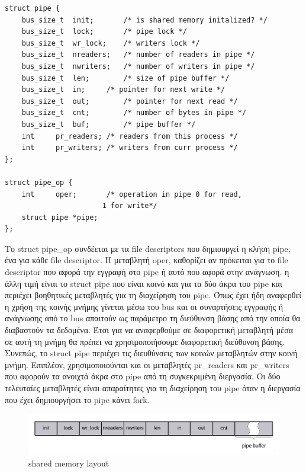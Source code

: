 \begin{lstlisting}
struct pipe {
	bus_size_t	init;		/* is shared memory initalized? */
	bus_size_t	lock;		/* pipe lock */
	bus_size_t	wr_lock;	/* writers lock */
	bus_size_t	nreaders;	/* number of readers in pipe */
	bus_size_t	nwriters;	/* number of writers in pipe */
	bus_size_t	len;		/* size of pipe buffer */
	bus_size_t	in;		/* pointer for next write */
	bus_size_t	out;		/* pointer for next read */
	bus_size_t	cnt;		/* number of bytes in pipe */
	bus_size_t	buf;		/* pipe buffer */
	int		pr_readers;	/* readers from this process */
	int		pr_writers;	/* writers from curr process */
};

struct pipe_op {
	int		oper;		/* operation in pipe 0 for read,
					   1 for write*/
	struct pipe	*pipe;
};
\end{lstlisting}

Το struct pipe\_op συνδέεται με τα file descriptors που δημιουργεί η κλήση pipe,
ένα για κάθε file descriptor. H μεταβλητή oper, καθορίζει αν πρόκειται για το
file descriptor που αφορά την εγγραφή στο pipe ή αυτό που αφορά στην ανάγνωση. η
άλλη τιμή είναι το struct pipe που είναι κοινό και για τα δύο άκρα του pipe και
περιέχει βοηθητικές μεταβλητές για τη διαχείρηση του pipe. Όπως έχει ήδη
αναφερθεί η χρήση της κοινής μνήμης γίνεται μέσω του bus και οι συναρτήσεις
εγγραφής ή ανάγνωσης από το bus απαιτούν ως παράμετρο τη διεύθυνση βάσης από την
οποία θα διαβαστούν τα δεδομένα. Έτσι για να αναφερθούμε σε διαφορετική
μεταβλητή μέσα σε αυτή τη μνήμη θα πρέπει να χρησιμοποιήσουμε διαφορετική
διεύθυνση βάσης. Συνεπώς, το struct pipe περιέχει τις διευθύνσεις των κοινών
μεταβλητών στην κοινή μνήμη. Επιπλέον, χρησιμοποιούνται και οι μεταβλητές
pr\_readers και pr\_writers που αφορούν τα ανοιχτά άκρα στο pipe από τη
συγκεκριμένη διεργασία. Οι δύο τελευταίες μεταβλητές είναι απαραίτητες για τη
διαχείρηση του pipe όταν η διεργασία που έχει δημιουργήσει το pipe κάνει fork.

\begin{figure}[htp]
\centering
\includegraphics{figures/shared_memoery_layout.png}
\caption{shared memory layout\label{fig4_5}}
\end{figure}

